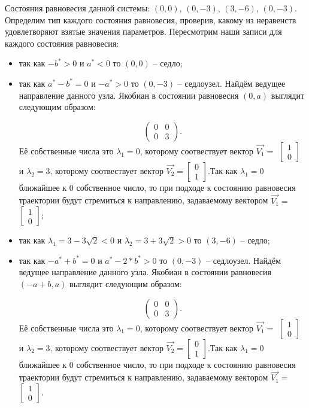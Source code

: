 Состояния равновесия данной системы: $(0, 0)$, $(0, -3)$, $(3, -6)$, $(0, -3)$. Определим тип каждого состояния равновесия, проверив, какому из неравенств удовлетворяют взятые значения параметров.  Пересмотрим наши записи для каждого состояния равновесия: 
\begin{itemize}
	\item{ так как $-b^\ast > 0 $ и $a^\ast  < 0 $ то $(0, 0)$ -- седло;}
	\item{ так как $a^\ast - b^\ast = 0 $ и $-a^\ast > 0 $ то $(0, -3)$ -- седлоузел. Найдём ведущее направление данного узла. Якобиан в состоянии равновесия $(0, a)$ выглядит следующим образом:
		
		$$\begin{pmatrix}0 & 0\\0 & 3\end{pmatrix}. $$Её собственные числа это $\lambda_1=0$, которому соотвествует вектор $\Vec{V_1}=$ $\left[\begin{matrix}1\\0\end{matrix}\right]$ и $\lambda_2=3$, которому соотвествует вектор $\Vec{V_2}=$$\left[\begin{matrix}0\\1\end{matrix}\right]$.Так как $\lambda_1=0$ ближайшее к $0$ собственное число, то при подходе к состоянию равновесия траектории будут стремиться к направлению, задаваемому вектором $\Vec{V_1}=$ $\left[\begin{matrix}1\\0\end{matrix}\right]$;}
	\item{ так как ${\lambda_{1}} = 3 - 3 \sqrt{2}$$  < 0 $ и ${\lambda_{2}} = 3 + 3 \sqrt{2}$$ > 0 $ то $(3, -6)$ -- седло;}
	\item{ так как $-a^\ast + b^\ast = 0 $ и $a^\ast - 2*b^\ast > 0 $ то $(0, -3)$ -- седлоузел. Найдём ведущее направление данного узла. Якобиан в состоянии равновесия $(-a + b, a)$ выглядит следующим образом:
		
		$$\begin{pmatrix}0 & 0\\0 & 3\end{pmatrix}. $$Её собственные числа это $\lambda_1=0$, которому соотвествует вектор $\Vec{V_1}=$ $\left[\begin{matrix}1\\0\end{matrix}\right]$ и $\lambda_2=3$, которому соотвествует вектор $\Vec{V_2}=$$\left[\begin{matrix}0\\1\end{matrix}\right]$.Так как $\lambda_1=0$ ближайшее к $0$ собственное число, то при подходе к состоянию равновесия траектории будут стремиться к направлению, задаваемому вектором $\Vec{V_1}=$ $\left[\begin{matrix}1\\0\end{matrix}\right]$.}
\end{itemize} 

